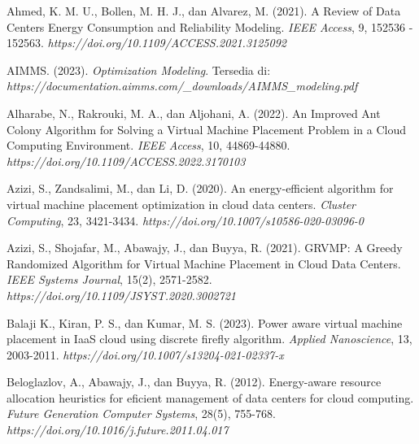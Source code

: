 \begin{thebibliography}{99}

	Ahmed, K. M. U., Bollen, M. H. J., dan Alvarez, M. (2021). A Review of Data Centers Energy Consumption and Reliability Modeling. \textit{IEEE Access}, 9, 152536 - 152563. \textit{https://doi.org/10.1109/ACCESS.2021.3125092}
	
	

	AIMMS. (2023). \textit{Optimization Modeling}. Tersedia di: \textit{https://documentation.aimms.com/\_downloads/AIMMS\_modeling.pdf}
	
	

	Alharabe, N., Rakrouki, M. A., dan Aljohani, A. (2022). An Improved Ant Colony Algorithm for Solving a Virtual Machine Placement Problem in a Cloud Computing Environment. \textit{IEEE Access}, 10, 44869-44880. \textit{https://doi.org/10.1109/ACCESS.2022.3170103}
	
	

	Azizi, S., Zandsalimi, M., dan Li, D. (2020). An energy-efficient algorithm for virtual machine placement optimization in cloud data centers. \textit{Cluster Computing}, 23, 3421-3434. \textit{https://doi.org/10.1007/s10586-020-03096-0}
	
	

	Azizi, S., Shojafar, M., Abawajy, J., dan Buyya, R. (2021). GRVMP: A Greedy Randomized Algorithm for Virtual Machine Placement in Cloud Data Centers. \textit{IEEE Systems Journal}, 15(2), 2571-2582. \textit{https://doi.org/10.1109/JSYST.2020.3002721}
	
	

	Balaji K., Kiran, P. S., dan Kumar, M. S. (2023). Power aware virtual machine placement in IaaS cloud using discrete firefly algorithm. \textit{Applied Nanoscience}, 13, 2003-2011. \textit{https://doi.org/10.1007/s13204-021-02337-x}

	

	Beloglazlov, A., Abawajy, J., dan Buyya, R. (2012). Energy-aware resource allocation heuristics for eficient management of data centers for cloud computing. \textit{Future Generation Computer Systems}, 28(5), 755-768. \textit{https://doi.org/10.1016/j.future.2011.04.017}
	


\end{thebibliography}
